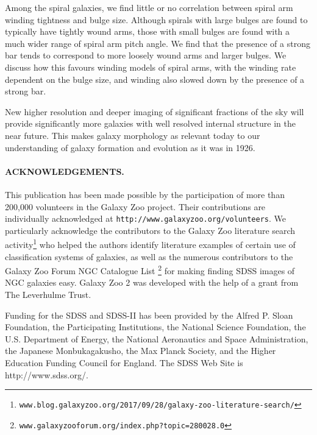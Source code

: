 \documentclass[usenatbib]{mn2e}
\begin{document}
Among the spiral galaxies, we find little or no correlation between spiral arm winding tightness and bulge size. Although spirals with large bulges are found to typically have tightly wound  arms, those with small bulges are found with a much wider range of spiral arm pitch angle. We find that the presence of a strong bar tends to correspond to more loosely wound arms and larger bulges. We discuss how this favours winding models of spiral arms, with the winding rate dependent on the bulge size, and winding also slowed down by the presence of a strong bar. 

 New higher resolution and deeper imaging of significant fractions of the sky will provide significantly more galaxies with well resolved internal structure in the near future. This makes galaxy morphology as relevant today to our understanding of galaxy formation and evolution as it was in 1926. %
  
\paragraph*{ACKNOWLEDGEMENTS.} 

This publication has been made possible by the participation of more than 200,000 volunteers in the Galaxy Zoo project. Their contributions are individually acknowledged at \texttt{http://www.galaxyzoo.org/volunteers}.  We particularly acknowledge the contributors to the Galaxy Zoo literature search activity\footnote{\tt www.blog.galaxyzoo.org/2017/09/28/galaxy-zoo-literature-search/} who helped the authors identify literature examples of certain use of classification systems of galaxies, as well as the numerous contributors to the Galaxy Zoo Forum NGC Catalogue List \footnote{\tt www.galaxyzooforum.org/index.php?topic=280028.0} for making finding SDSS images of NGC galaxies easy. Galaxy Zoo 2 was developed with the help of a grant from The Leverhulme Trust.

Funding for the SDSS and SDSS-II has been provided by the Alfred P. Sloan Foundation, the Participating Institutions, the National Science Foundation, the U.S. Department of Energy, the National Aeronautics and Space Administration, the Japanese Monbukagakusho, the Max Planck Society, and the Higher Education Funding Council for England. The SDSS Web Site is http://www.sdss.org/. 
\end{document}
